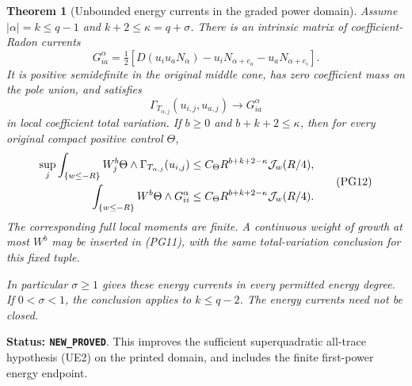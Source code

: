 \documentclass[11pt,a4paper]{article}
\numberwithin{equation}{section}
\newtheorem{theorem}{Theorem}[section]
\theoremstyle{definition}
\theoremstyle{remark}
\begin{document}
\begin{theorem}[Unbounded energy currents in the graded power domain]
\label{thm:r11-power-graded-energy}
Assume $|\alpha|=k\leq q-1$ and $k+2\leq\kappa=q+\sigma$.
There is an intrinsic matrix of coefficient-Radon currents
\[
 G^\alpha_{ia}
  =\tfrac12\left[
     D(u_i u_aN_\alpha)-u_iN_{\alpha+e_a}
                           -u_aN_{\alpha+e_i}\right].
 \tag{PG10}
\]
It is positive semidefinite in the original middle cone,
has zero coefficient mass on the pole union, and satisfies
\[
       \Gamma_{T_{\alpha,j}}(u_{i,j},u_{a,j})
                                \longrightarrow G^\alpha_{ia}
 \tag{PG11}
\]
in local coefficient total variation. If $b\geq0$ and
$b+k+2\leq\kappa$, then for every original compact positive
control $\Theta$,
\[
 \begin{split}
 \sup_j\int_{\{w\leq-R\}} W_j^b
           \Theta\wedge\Gamma_{T_{\alpha,j}}(u_{i,j})
   &\leq C_\Theta R^{b+k+2-\kappa}{\cal J}_w(R/4),\\
 \int_{\{w\leq-R\}} W^b\Theta\wedge G^\alpha_{ii}
   &\leq C_\Theta R^{b+k+2-\kappa}{\cal J}_w(R/4).
 \end{split}
 \tag{PG12}
\]
The corresponding full local moments are finite. A continuous
weight of growth at most $W^b$ may be inserted in (PG11),
with the same total-variation conclusion for this fixed tuple.

In particular $\sigma\geq1$ gives these energy currents in
every permitted energy degree. If $0<\sigma<1$, the conclusion
applies to $k\leq q-2$. The energy currents need not be closed.
\end{theorem}

\noindent\textbf{Status: \texttt{NEW\_PROVED}}. This improves
the sufficient superquadratic all-trace hypothesis (UE2) on the
printed domain, and includes the finite first-power energy endpoint.
\end{document}
